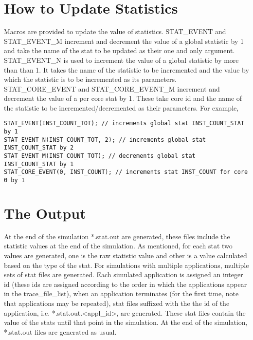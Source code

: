 \section{How to Update Statistics}


Macros are provided to update the value of statistics. STAT\_EVENT and
STAT\_EVENT\_M increment and decrement the value of a global statistic by 1 and
take the name of the stat to be updated as their one and only argument.
STAT\_EVENT\_N is used to increment the value of a global statistic by more
than than 1. It takes the name of the statistic to be incremented and the value
by which the statistic is to be incremented as its parameters.
STAT\_CORE\_EVENT and STAT\_CORE\_EVENT\_M increment and decrement the value of
a per core stat by 1. These take core id and the name of the statistic to be
incremented/decremented as their parameters. For example,

\begin{Verbatim}
STAT_EVENT(INST_COUNT_TOT); // increments global stat INST_COUNT_STAT by 1
STAT_EVENT_N(INST_COUNT_TOT, 2); // increments global stat INST_COUNT_STAT by 2
STAT_EVENT_M(INST_COUNT_TOT); // decrements global stat INST_COUNT_STAT by 1
STAT_CORE_EVENT(0, INST_COUNT); // increments stat INST_COUNT for core 0 by 1
\end{Verbatim}



\section{The Output}

At the end of the simulation *.stat.out are generated, these files include the
statistic values at the end of the simulation. As mentioned, for each stat two
values are generated, one is the raw statistic value and other is a value
calculated based on the type of the stat. For simulations with multiple
applications, multiple sets of stat files are generated. Each simulated
application is assigned an integer id (these ids are assigned according to the
    order in which the applications appear in the trace\_file\_list), when an
application terminates (for the first time, note that applications may be
    repeated), stat files suffixed with the the id of the application, i.e.
*.stat.out.<appl\_id>, are generated. These stat files contain the value of the
stats until that point in the simulation. At the end of the simulation,
      *.stat.out files are generated as usual.



